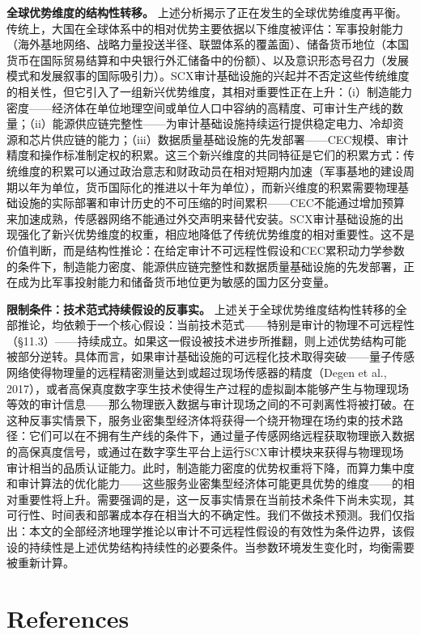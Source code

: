 \documentclass[12pt,a4paper]{ctexart}
\theoremstyle{definition}
\theoremstyle{remark}
\begin{document}
\textbf{全球优势维度的结构性转移。} 上述分析揭示了正在发生的全球优势维度再平衡。传统上，大国在全球体系中的相对优势主要依据以下维度被评估：军事投射能力（海外基地网络、战略力量投送半径、联盟体系的覆盖面）、储备货币地位（本国货币在国际贸易结算和中央银行外汇储备中的份额）、以及意识形态号召力（发展模式和发展叙事的国际吸引力）。SCX审计基础设施的兴起并不否定这些传统维度的相关性，但它引入了一组新兴优势维度，其相对重要性正在上升：（i）制造能力密度——经济体在单位地理空间或单位人口中容纳的高精度、可审计生产线的数量；（ii）能源供应链完整性——为审计基础设施持续运行提供稳定电力、冷却资源和芯片供应链的能力；（iii）数据质量基础设施的先发部署——CEC规模、审计精度和操作标准制定权的积累。这三个新兴维度的共同特征是它们的积累方式：传统维度的积累可以通过政治意志和财政动员在相对短期内加速（军事基地的建设周期以年为单位，货币国际化的推进以十年为单位），而新兴维度的积累需要物理基础设施的实际部署和审计历史的不可压缩的时间累积——CEC不能通过增加预算来加速成熟，传感器网络不能通过外交声明来替代安装。SCX审计基础设施的出现强化了新兴优势维度的权重，相应地降低了传统优势维度的相对重要性。这不是价值判断，而是结构性推论：在给定审计不可远程性假设和CEC累积动力学参数的条件下，制造能力密度、能源供应链完整性和数据质量基础设施的先发部署，正在成为比军事投射能力和储备货币地位更为敏感的国力区分变量。

\textbf{限制条件：技术范式持续假设的反事实。} 上述关于全球优势维度结构性转移的全部推论，均依赖于一个核心假设：当前技术范式——特别是审计的物理不可远程性（§11.3）——持续成立。如果这一假设被技术进步所推翻，则上述优势结构可能被部分逆转。具体而言，如果审计基础设施的可远程化技术取得突破——量子传感网络使得物理量的远程精密测量达到或超过现场传感器的精度（Degen et al., 2017），或者高保真度数字孪生技术使得生产过程的虚拟副本能够产生与物理现场等效的审计信息——那么物理嵌入数据与审计现场之间的不可剥离性将被打破。在这种反事实情景下，服务业密集型经济体将获得一个绕开物理在场约束的技术路径：它们可以在不拥有生产线的条件下，通过量子传感网络远程获取物理嵌入数据的高保真度信号，或通过在数字孪生平台上运行SCX审计模块来获得与物理现场审计相当的品质认证能力。此时，制造能力密度的优势权重将下降，而算力集中度和审计算法的优化能力——这些服务业密集型经济体可能更具优势的维度——的相对重要性将上升。需要强调的是，这一反事实情景在当前技术条件下尚未实现，其可行性、时间表和部署成本存在相当大的不确定性。我们不做技术预测。我们仅指出：本文的全部经济地理学推论以审计不可远程性假设的有效性为条件边界，该假设的持续性是上述优势结构持续性的必要条件。当参数环境发生变化时，均衡需要被重新计算。


\section*{References}
\end{document}
